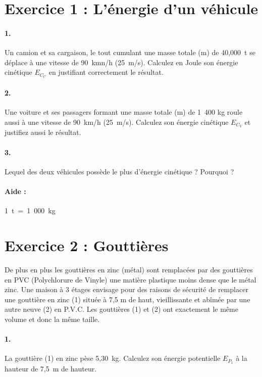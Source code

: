 \documentclass[12pt,a4paper]{article}
\begin{document}
\section*{Exercice 1 : L'énergie d'un véhicule}
\paragraph{1.} Un camion et sa cargaison, le tout cumulant une masse totale (m) de 40,000~t se déplace à une vitesse de 90~kmn/h (25~m/s). Calculez en Joule son énergie cinétique $E_{C_C}$ en justifiant correctement le résultat.

\paragraph{2.} Une voiture et ses passagers formant une masse totale (m) de 1~400 kg roule aussi à une vitesse de 90~km/h (25~m/s). Calculez son énergie cinétique $E_{C_V}$ et justifiez aussi le résultat.

\paragraph{3.} Lequel des deux véhicules possède le plus d'énergie cinétique ? Pourquoi ?

\paragraph{Aide :} 1~t~=~1~000~kg

\section*{Exercice 2 : Gouttières}
De plus en plus les gouttières en zinc (métal) sont remplacées par des gouttières en PVC (Polychlorure de Vinyle) une matière plastique moins dense que le métal zinc. Une maison à 3 étages envisage pour des raisons de sécurité de remplacer une gouttière en zinc (1) située à 7,5 m de haut, vieillissante et abîmée par une autre neuve (2) en P.V.C. Les gouttières (1) et (2) ont exactement le même volume et donc la même taille.

\paragraph{1.} La gouttière (1) en zinc pèse 5,30~kg. Calculez son énergie potentielle $E_{P_1}$ à la hauteur de 7,5~m de hauteur.
\end{document}
